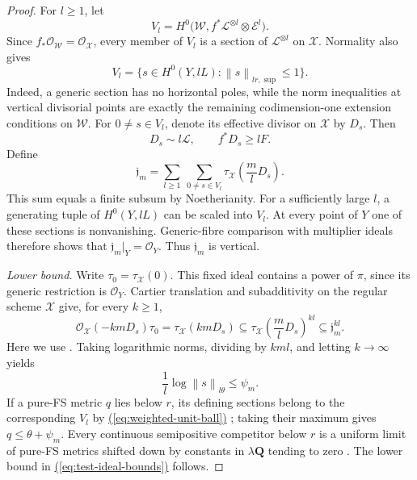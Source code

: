\documentclass[11pt]{amsart}
\theoremstyle{definition}
\theoremstyle{remark}
\numberwithin{equation}{section}
\newcommand{\OO}{\mathcal O}
\newcommand{\cX}{\mathscr X}
\newcommand{\cW}{\mathscr W}
\newcommand{\cL}{\mathscr L}
\newcommand{\cE}{\mathscr E}
\newcommand{\norm}[1]{\left\lVert#1\right\rVert}
\renewcommand{\eqref}[1]{%
 \begingroup\hypersetup{linkcolor=equationviolet}%
 \hyperref[#1]{\textup{(\ref*{#1})}}%
 \endgroup}
\begin{document}
\begin{proof}
For \(l\ge1\), let
\[
 V_l=H^0\bigl(\cW,f^*\cL^{\otimes l}\otimes\cE^l\bigr).
\]
Since \(f_*\OO_{\cW}=\OO_{\cX}\), every member of \(V_l\) is a section
of \(\cL^{\otimes l}\) on \(\cX\). Normality also gives
\begin{equation}\label{eq:weighted-unit-ball}
 V_l=\{s\in H^0(Y,lL):\norm{s}_{lr,\sup}\le1\}.
\end{equation}
Indeed, a generic section has no horizontal poles, while the norm
inequalities at vertical divisorial points are exactly the remaining
codimension-one extension conditions on \(\cW\).
For \(0\ne s\in V_l\), denote its effective divisor on \(\cX\) by \(D_s\).
Then
\[
 D_s\sim l\cL,\qquad f^*D_s\ge lF.
\]
Define
\begin{equation}\label{eq:divisor-sum}
 \mathfrak j_m
 =\sum_{l\ge1}\ \sum_{0\ne s\in V_l}
       \tau_{\cX}\!\left(\frac mlD_s\right).
\end{equation}
This sum equals a finite subsum by Noetherianity.
For a sufficiently large \(l\), a generating tuple of \(H^0(Y,lL)\)
can be scaled into \(V_l\). At every point of \(Y\) one of these
sections is nonvanishing. Generic-fibre comparison with multiplier
ideals \cite[Corollary~7.21(e)]{BMP} therefore shows that
\(\mathfrak j_m|_Y=\OO_Y\). Thus \(\mathfrak j_m\) is vertical.

\smallskip\noindent
\emph{Lower bound.}
Write \(\tau_0=\tau_{\cX}(0)\). This fixed ideal contains a power of \(\pi\),
since its generic restriction is \(\OO_Y\).
Cartier translation and subadditivity on the regular scheme \(\cX\)
give, for every \(k\ge1\),
\begin{equation}\label{eq:lower-ideal}
 \OO_{\cX}(-kmD_s)\tau_0
 =\tau_{\cX}(kmD_s)
 \subseteq
 \tau_{\cX}\!\left(\frac mlD_s\right)^{kl}
 \subseteq\mathfrak j_m^{kl}.
\end{equation}
Here we use \cite[Proposition~7.16(b) and Theorem~7.22(e)]{BMP}.
Taking logarithmic norms, dividing by \(kml\), and letting \(k\to\infty\)
yields
\[
 \frac1l\log\norm{s}_{l\theta}\le\psi_m.
\]
If a pure-FS metric \(q\) lies below \(r\), its defining sections belong
to the corresponding \(V_l\) by \eqref{eq:weighted-unit-ball}; taking their
maximum gives \(q\le\theta+\psi_m\).
Every continuous semipositive competitor below \(r\) is a uniform
limit of pure-FS metrics shifted down by constants in
\(\lambda\mathbf Q\) tending to zero
\cite[Corollary~7.6 and Theorem~7.8]{BE}.
The lower bound in \eqref{eq:test-ideal-bounds} follows.


\end{proof}
\end{document}
